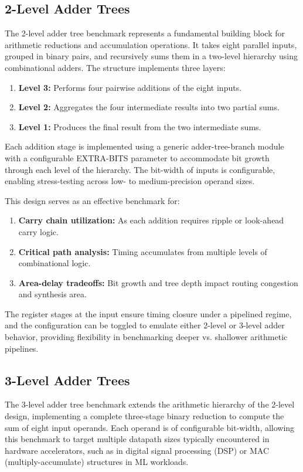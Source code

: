 \subsection{2-Level Adder Trees}
The 2-level adder tree benchmark represents a fundamental building block for arithmetic reductions and accumulation operations. It takes eight parallel inputs, grouped in binary pairs, and recursively sums them in a two-level hierarchy using combinational adders. The structure implements three layers:
\begin{enumerate}
	\item \textbf{Level 3:} Performs four pairwise additions of the eight inputs.
	\item \textbf{Level 2:} Aggregates the four intermediate results into two partial sums.
	\item \textbf{Level 1:} Produces the final result from the two intermediate sums. 	
\end{enumerate}

Each addition stage is implemented using a generic adder-tree-branch module with a configurable EXTRA-BITS parameter to accommodate bit growth through each level of the hierarchy. The bit-width of inputs is configurable, enabling stress-testing across low- to medium-precision operand sizes.

This design serves as an effective benchmark for:
\begin{enumerate}
	\item \textbf{Carry chain utilization:} As each addition requires ripple or look-ahead carry logic.
	\item \textbf{Critical path analysis:} Timing accumulates from multiple levels of combinational logic.
	\item \textbf{Area-delay tradeoffs:} Bit growth and tree depth impact routing congestion and synthesis area.
\end{enumerate}

The register stages at the input ensure timing closure under a pipelined regime, and the configuration can be toggled to emulate either 2-level or 3-level adder behavior, providing flexibility in benchmarking deeper vs. shallower arithmetic pipelines.

\subsection{3-Level Adder Trees}
The 3-level adder tree benchmark extends the arithmetic hierarchy of the 2-level design, implementing a complete three-stage binary reduction to compute the sum of eight input operands. Each operand is of configurable bit-width, allowing this benchmark to target multiple datapath sizes typically encountered in hardware accelerators, such as in digital signal processing (DSP) or MAC (multiply-accumulate) structures in ML workloads.

